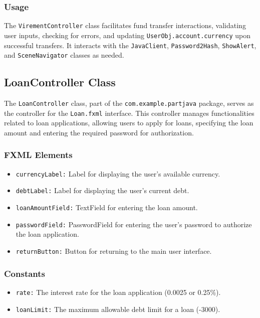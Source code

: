 \documentclass{article}
\begin{document}
\subsubsection{Usage}

The \texttt{VirementController} class facilitates fund transfer interactions, validating user inputs, checking for errors, and updating \texttt{UserObj.account.currency} upon successful transfers. It interacts with the \texttt{JavaClient}, \texttt{Password2Hash}, \texttt{ShowAlert}, and \texttt{SceneNavigator} classes as needed.

\subsection{LoanController Class}

The \texttt{LoanController} class, part of the \texttt{com.example.partjava} package, serves as the controller for the \texttt{Loan.fxml} interface. This controller manages functionalities related to loan applications, allowing users to apply for loans, specifying the loan amount and entering the required password for authorization.

\subsubsection{FXML Elements}

\begin{itemize}
    \item \texttt{currencyLabel:} Label for displaying the user's available currency.
    \item \texttt{debtLabel:} Label for displaying the user's current debt.
    \item \texttt{loanAmountField:} TextField for entering the loan amount.
    \item \texttt{passwordField:} PasswordField for entering the user's password to authorize the loan application.
    \item \texttt{returnButton:} Button for returning to the main user interface.
\end{itemize}

\subsubsection{Constants}

\begin{itemize}
    \item \texttt{rate:} The interest rate for the loan application (0.0025 or 0.25\%).
    \item \texttt{loanLimit:} The maximum allowable debt limit for a loan (-3000).
\end{itemize}
\end{document}
